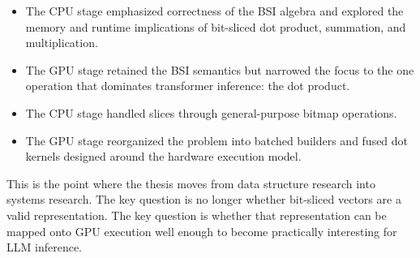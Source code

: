 \begin{itemize}[leftmargin=2em]
\item The CPU stage emphasized correctness of the BSI algebra and explored the memory and runtime implications of bit-sliced dot product, summation, and multiplication.
\item The GPU stage retained the BSI semantics but narrowed the focus to the one operation that dominates transformer inference: the dot product.
\item The CPU stage handled slices through general-purpose bitmap operations.
\item The GPU stage reorganized the problem into batched builders and fused dot kernels designed around the hardware execution model.
\end{itemize}

This is the point where the thesis moves from data structure research into systems research. The key question is no longer whether bit-sliced vectors are a valid representation. The key question is whether that representation can be mapped onto GPU execution well enough to become practically interesting for LLM inference.
